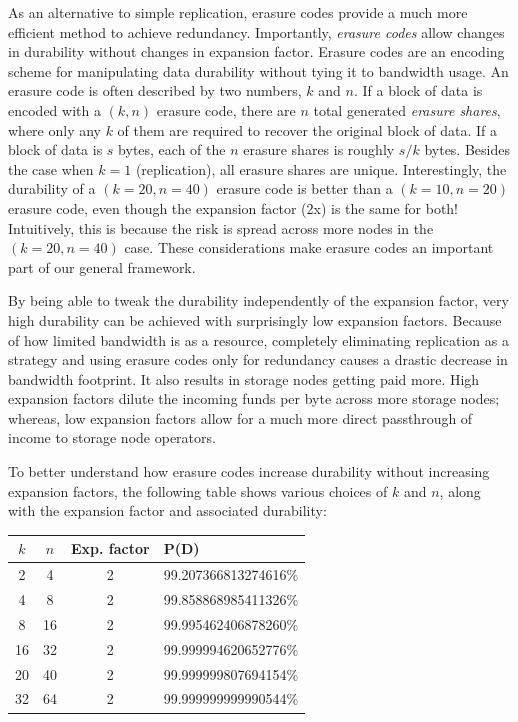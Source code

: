 \documentclass[8pt,fleqn,openany]{book}
\begin{document}
As an alternative to simple replication, erasure codes provide a much more efficient method to achieve redundancy. Importantly, {\em erasure
codes} allow changes in durability without changes in expansion factor.
Erasure codes are an encoding scheme for manipulating
data durability without tying it to bandwidth usage.
An erasure code is often described by two numbers, $k$ and $n$. If a block of
data is encoded with a $(k,n)$ erasure code, there are $n$ total generated {\em
erasure shares}, where only any $k$ of them are required to recover the original
block of data. If a block of data is $s$ bytes, each of the $n$ erasure shares
is roughly $s/k$ bytes. Besides the case when $k=1$ (replication), all erasure
shares are unique. Interestingly, the durability of a $(k=20,n=40)$ erasure code
is better than a $(k=10,n=20)$ erasure code, even though the expansion factor
(2x) is the same for both! Intuitively, this is because the risk is spread
across more nodes in the $(k=20,n=40)$ case. These considerations make erasure
codes an important part of our general framework.

By being able to tweak the durability independently of the expansion factor,
very high durability can be achieved with surprisingly low expansion factors.
Because of how limited bandwidth is as a resource, completely eliminating replication as a
strategy and using erasure codes only for redundancy causes a drastic
decrease in bandwidth footprint.
It also results in storage nodes getting paid more. High expansion factors
dilute the incoming funds per byte across more storage nodes; whereas, low
expansion factors allow for a much more direct passthrough of income to
storage node operators.

To better understand how erasure codes increase durability without
increasing expansion factors, the following table shows various choices of
$k$ and $n$, along with the expansion factor and associated durability:

\begin{center}
\begin{tabular}{c c c l}
$k$ & $n$ & Exp. factor & P(D) \\ \hline
2 & 4 & 2 & 99.207366813274616\%\\
4 & 8 & 2 & 99.858868985411326\%\\
8 & 16 & 2 & 99.995462406878260\%\\
16 & 32 & 2 & 99.999994620652776\%\\
20 & 40 & 2 & 99.999999807694154\%\\
32 & 64 & 2 & 99.999999999990544\%\\
\end{tabular}
\end{center}
\end{document}
